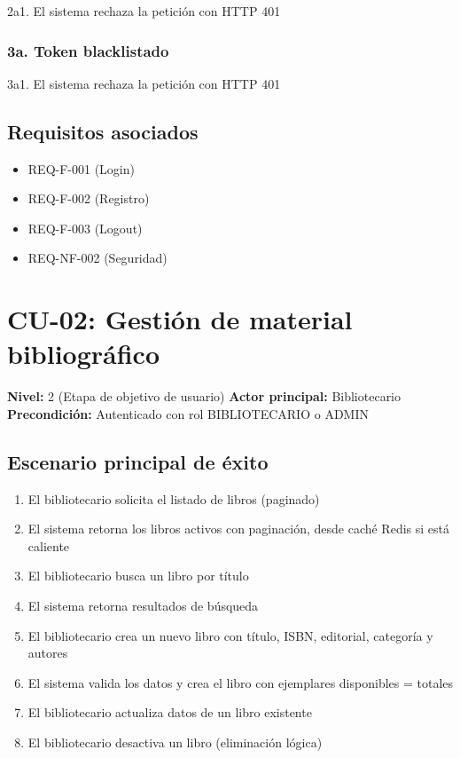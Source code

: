 \documentclass[
11pt,
a4paper,
]{report}
\providecommand{\tightlist}{%
	\setlength{\itemsep}{0pt}\setlength{\parskip}{0pt}}
\begin{document}
	2a1. El sistema rechaza la petición con HTTP 401
	
	\hypertarget{a.-token-blacklistado}{%
		\subsubsection{3a. Token blacklistado}\label{a.-token-blacklistado}}
	
	3a1. El sistema rechaza la petición con HTTP 401
	
	\hypertarget{requisitos-asociados}{%
		\subsection{Requisitos asociados}\label{requisitos-asociados}}
	
	\begin{itemize}
		\tightlist
		\item
		REQ-F-001 (Login)
		\item
		REQ-F-002 (Registro)
		\item
		REQ-F-003 (Logout)
		\item
		REQ-NF-002 (Seguridad)
	\end{itemize}
	
	\hypertarget{cu-02-gestiuxf3n-de-material-bibliogruxe1fico}{%
		\section{CU-02: Gestión de material bibliográfico}\label{cu-02-gestiuxf3n-de-material-bibliogruxe1fico}}
	
	\textbf{Nivel:} 2 (Etapa de objetivo de usuario)
	\textbf{Actor principal:} Bibliotecario
	\textbf{Precondición:} Autenticado con rol BIBLIOTECARIO o ADMIN
	
	\hypertarget{escenario-principal-de-uxe9xito-1}{%
		\subsection{Escenario principal de éxito}\label{escenario-principal-de-uxe9xito-1}}
	
	\begin{enumerate}
		\def\labelenumi{\arabic{enumi}.}
		\tightlist
		\item
		El bibliotecario solicita el listado de libros (paginado)
		\item
		El sistema retorna los libros activos con paginación, desde caché Redis si está caliente
		\item
		El bibliotecario busca un libro por título
		\item
		El sistema retorna resultados de búsqueda
		\item
		El bibliotecario crea un nuevo libro con título, ISBN, editorial, categoría y autores
		\item
		El sistema valida los datos y crea el libro con ejemplares disponibles = totales
		\item
		El bibliotecario actualiza datos de un libro existente
		\item
		El bibliotecario desactiva un libro (eliminación lógica)
	\end{enumerate}
	
\end{document}
